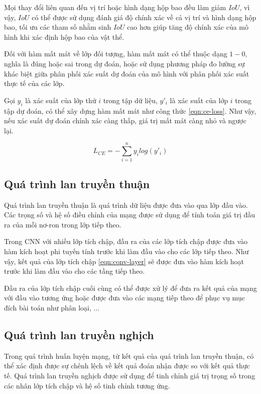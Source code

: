Mọi thay đổi liên quan đến vị trí hoặc hình dạng hộp bao đều làm giảm $IoU$, vì vậy, $IoU$ có thể được sử dụng đánh giá độ chính xác về cả vị trí và hình dạng hộp bao, tối ưu các tham số nhằm sinh $IoU$ cao hơn giúp tăng độ chính xác của mô hình khi xác định hộp bao của vật thể.

Đối với hàm mất mát về lớp đối tượng, hàm mất mát có thể thuộc dạng $1 - 0$, nghĩa là đúng hoặc sai trong dự đoán, hoặc sử dụng phương pháp đo lường sự khác biệt giữa phân phối xác suất dự đoán của mô hình với phân phối xác suất thực tế của các lớp.

Gọi $y_i$ là xác suất của lớp thứ $i$ trong tập dữ liệu, $y'_i$ là xác suất của lớp $i$ trong tập dự đoán, có thể xây dựng hàm mất mát như công thức \ref{eqn:ce-loss}. Như vậy, nếu xác suất dự đoán chính xác càng thấp, giá trị mất mát càng nhỏ và ngược lại.

\begin{equation}
	\label{eqn:ce-loss}
	L_{CE} = - \sum_{i = 1}^{n}y_ilog(y'_i)
\end{equation}

\subsection{Quá trình lan truyền thuận}

Quá trình lan truyền thuận là quá trình dữ liệu được đưa vào qua lớp đầu vào. Các trọng số và hệ số điều chỉnh của mạng được sử dụng để tính toán giá trị đầu ra của mỗi nơ-ron trong lớp tiếp theo.

Trong CNN với nhiều lớp tích chập, đầu ra của các lớp tích chập được đưa vào hàm kích hoạt phi tuyến tính trước khi làm đầu vào cho các lớp tiếp theo. Như vậy, kết quả của lớp tích chập \ref{eqn:conv-layer} sẽ được đưa vào hàm kích hoạt trước khi làm đầu vào cho các tầng tiếp theo. 

Đầu ra của lớp tích chập cuối cùng có thể được xử lý để đưa ra kết quả của mạng với đầu vào tương ứng hoặc được đưa vào các mạng tiếp theo để phục vụ mục đích bài toán như phân loại, ...



\subsection{Quá trình lan truyền nghịch}
Trong quá trình huấn luyện mạng, từ kết quả của quá trình lan truyền thuận, có thể xác định được sự chênh lệch về kết quả đoán nhận được so với kết quả thực tế. Quá trình lan truyền nghịch được sử dụng để tinh chỉnh giá trị trọng số trong các nhân lớp tích chập và hệ số tinh chỉnh tương ứng. 

